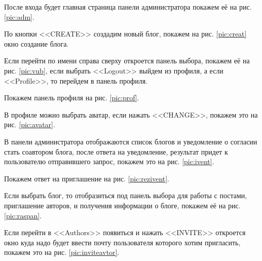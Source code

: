 
\pagebreak
После входа будет главная страница панели администратора покажем её на рис. \ref{pic:adm}.


По кнопки <<CREATE>> создадим новый блог, покажем на рис. \ref{pic:creat} окно создание блога.


Если перейти по имени справа сверху откроется панель выбора, покажем её на рис. \ref{pic:vub}, если выбрать <<Logout>> выйдем из профиля, а если <<Profile>>, то перейдем в панель профиля.


\pagebreak
Покажем панель профиля на рис. \ref{pic:prof}.


В профиле можно выбрать аватар, если нажать <<CHANGE>>, покажем это на рис. \ref{pic:avatar}.


В панели администратора отображаются список блогов и уведомление о согласии стать соавтором блога, после ответа на уведомление, результат придет к пользователю отправившего запрос, покажем это на рис. \ref{pic:ivent}.


Покажем ответ на приглашение на рис. \ref{pic:rezivent}.



Если выбрать блог, то отобразиться под панель выбора для работы с постами, приглашение авторов, и получения информации о блоге, покажем её на рис. \ref{pic:raspan}.


Если перейти в <<Authors>> появиться и нажать <<INVITE>> откроется окно куда надо будет ввести почту пользователя которого хотим пригласить, покажем это на рис. \ref{pic:inviteavtor}.


